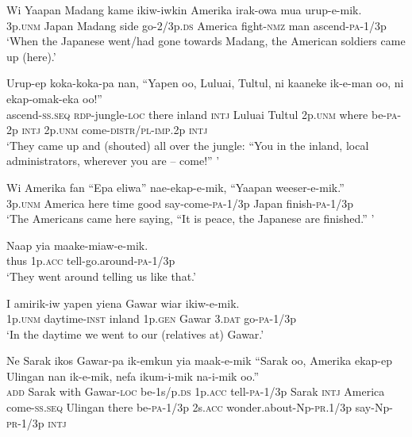 \ea
\gll  Wi  Yaapan  Madang  kame  ikiw-iwkin  Amerika  irak-owa mua  urup-e-mik. \\
3p.\textsc{unm}  Japan  Madang  side  go-2/3p.\textsc{ds}  America  fight-\textsc{nmz}   man  ascend-\textsc{pa}-1/3p \\


\glt ‘When the Japanese went/had gone towards Madang, the American soldiers came up (here).’ \\
\z


\ea
\gll  Urup-ep  koka-koka-pa  nan,  “Yapen  oo,  Luluai,  Tultul,   ni  kaaneke  ik-e-man  oo,  ni  ekap-omak-eka               oo!” \\
ascend-\textsc{ss.seq}  \textsc{rdp}-jungle-\textsc{loc}  there  inland  \textsc{intj}  Luluai  Tultul 2p.\textsc{unm}  where  be-\textsc{pa}-2p  \textsc{intj}  2p.\textsc{unm}  come-\textsc{distr}/\textsc{pl}-\textsc{imp}.2p \textsc{intj} \\




\glt ‘They came up and (shouted) all over the jungle: “You in the inland, local administrators, wherever you are – come!” ’ \\
\z


\ea
\gll  Wi  Amerika  fan  “Epa  eliwa”  nae-ekap-e-mik,  “Yaapan  weeser-e-mik.” \\
3p.\textsc{unm}  America  here  time  good  say-come-\textsc{pa}-1/3p    Japan  finish-\textsc{pa}-1/3p \\


\glt ‘The Americans came here saying, “It is peace, the Japanese are finished.” ’ \\
\z


\ea
\gll  Naap  yia  maake-miaw-e-mik. \\
thus  1p.\textsc{acc}  tell-go.around-\textsc{pa}-1/3p \\
\glt ‘They went around telling us like that.’ \\
\z


\ea
\gll  I  amirik-iw  yapen  yiena  Gawar  wiar       ikiw-e-mik. \\
1p.\textsc{unm}  daytime-\textsc{inst}  inland  1p.\textsc{gen}  Gawar  3.\textsc{dat}  go-\textsc{pa}-1/3p \\


\glt ‘In the daytime we went to our (relatives at) Gawar.’ \\
\z


\ea
\gll  Ne  Sarak  ikos  Gawar-pa  ik-emkun  yia  maak-e-mik     “Sarak  oo,  Amerika  ekap-ep  Ulingan  nan  ik-e-mik,           nefa  ikum-i-mik  na-i-mik  oo.” \\
\textsc{add}  Sarak  with  Gawar-\textsc{loc}  be-1s/p.\textsc{ds}  1p.\textsc{acc}  tell-\textsc{pa}-1/3p  Sarak  \textsc{intj}  America  come-\textsc{ss.seq}  Ulingan  there  be-\textsc{pa}-1/3p    2s.\textsc{acc}  wonder.about-Np-\textsc{pr}.1/3p  say-Np-\textsc{pr}-1/3p  \textsc{intj} \\




